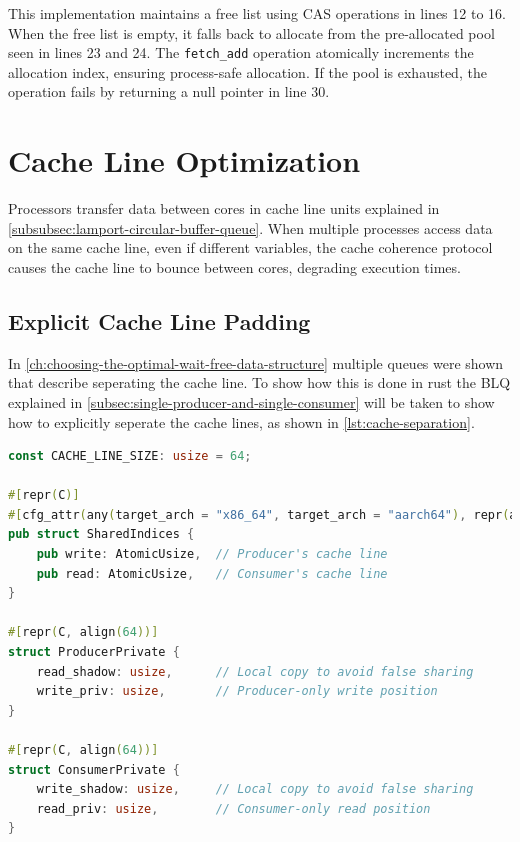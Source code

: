This implementation maintains a free list using \ac{CAS} operations in lines 12 to 16. When the free list is empty, it falls back to allocate from the pre-allocated pool seen in lines 23 and 24. The \texttt{fetch\_add} operation atomically increments the allocation index, ensuring process-safe allocation. If the pool is exhausted, the operation fails by returning a null pointer in line 30.

\section{Cache Line Optimization}
Processors transfer data between cores in cache line units explained in \cref{subsubsec:lamport-circular-buffer-queue}. When multiple processes access data on the same cache line, even if different variables, the cache coherence protocol causes the cache line to bounce between cores, degrading execution times.

\subsection{Explicit Cache Line Padding}

In \cref{ch:choosing-the-optimal-wait-free-data-structure} multiple queues were shown that describe seperating the cache line. To show how this is done in rust the \ac{BLQ} explained in \cref{subsec:single-producer-and-single-consumer} will be taken to show how to explicitly seperate the cache lines, as shown in \cref{lst:cache-separation}.

\begin{lstlisting}[language=Rust, style=boxed, caption={Cache line separation in BlqQueue}, label={lst:cache-separation}]
const CACHE_LINE_SIZE: usize = 64;

#[repr(C)]
#[cfg_attr(any(target_arch = "x86_64", target_arch = "aarch64"), repr(align(64)))]
pub struct SharedIndices {
    pub write: AtomicUsize,  // Producer's cache line
    pub read: AtomicUsize,   // Consumer's cache line
}

#[repr(C, align(64))]
struct ProducerPrivate {
    read_shadow: usize,      // Local copy to avoid false sharing
    write_priv: usize,       // Producer-only write position
}

#[repr(C, align(64))]
struct ConsumerPrivate {
    write_shadow: usize,     // Local copy to avoid false sharing
    read_priv: usize,        // Consumer-only read position
}
\end{lstlisting}

